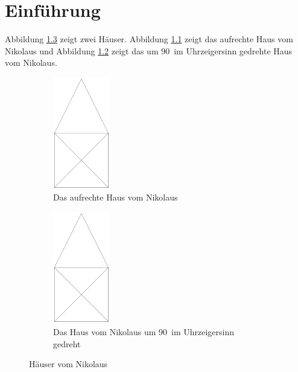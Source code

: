 \documentclass[12pt,a4paper,final]{scrbook}
\begin{document}
\chapter{Einführung}

Abbildung \ref{fig:Nikolaushaus} zeigt zwei Häuser. 
Abbildung \ref{fig:NikolaushausA} zeigt das aufrechte Haus vom Nikolaus und Abbildung \ref{fig:NikolaushausB} zeigt das um 90\textdegree~im Uhrzeigersinn gedrehte Haus vom Nikolaus. 

\begin{figure}[h!tb]
	\begin{subfigure}[b]{.49\textwidth} 
		\centering
		\includegraphics[width=2.5cm]{house.png}
		\caption{Das aufrechte Haus vom Nikolaus}
		\label{fig:NikolaushausA}
	\end{subfigure}
	\hfil
	\begin{subfigure}[b]{.49\textwidth}
		\centering
		\includegraphics[width=2.5cm,angle=270]{house.png}
		\caption{Das Haus vom Nikolaus um 90\textdegree~im Uhrzeigersinn gedreht} 
		\label{fig:NikolaushausB}
	\end{subfigure}
\caption{Häuser vom Nikolaus}
\label{fig:Nikolaushaus}
\end{figure} 
\end{document}
